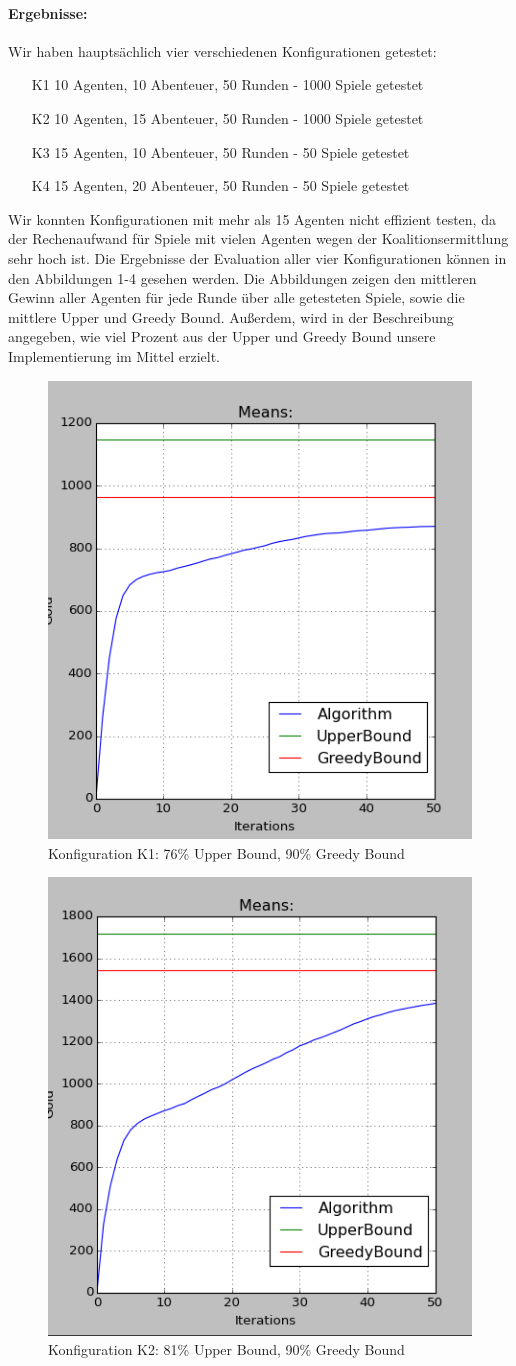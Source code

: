 \documentclass[fleqn,10pt]{SelfArx} %
\begin{document}
\paragraph{Ergebnisse:}
Wir haben hauptsächlich vier verschiedenen Konfigurationen getestet:
\begin{itemize}
  \item[K1] 10 Agenten, 10 Abenteuer, 50 Runden - 1000 Spiele getestet
  \item[K2] 10 Agenten, 15 Abenteuer, 50 Runden - 1000 Spiele getestet
  \item[K3] 15 Agenten, 10 Abenteuer, 50 Runden - 50 Spiele getestet
  \item[K4] 15 Agenten, 20 Abenteuer, 50 Runden - 50 Spiele getestet
\end{itemize}
Wir konnten Konfigurationen mit mehr als 15 Agenten nicht effizient testen, da der Rechenaufwand für Spiele mit vielen Agenten wegen der Koalitionsermittlung sehr hoch ist. Die Ergebnisse der Evaluation aller vier Konfigurationen können in den Abbildungen 1-4 gesehen werden. Die Abbildungen zeigen den mittleren Gewinn aller Agenten für jede Runde über alle getesteten Spiele, sowie die mittlere Upper und Greedy Bound. Außerdem, wird in der Beschreibung angegeben, wie viel Prozent aus der Upper und Greedy Bound unsere Implementierung im Mittel erzielt.
\begin{figure}
  \centering
  \includegraphics[width=.4\textwidth]{10ad_50r_1000it_cut.png}
  \caption{Konfiguration K1: 76\% Upper Bound, 90\% Greedy Bound}
\end{figure}
\label{fig:eval1}
\begin{figure}
  \centering
  \includegraphics[width=.4\textwidth]{15ad_50r_1000it_cut.png}
  \caption{Konfiguration K2: 81\% Upper Bound, 90\% Greedy Bound}
\end{figure}
\end{document}
